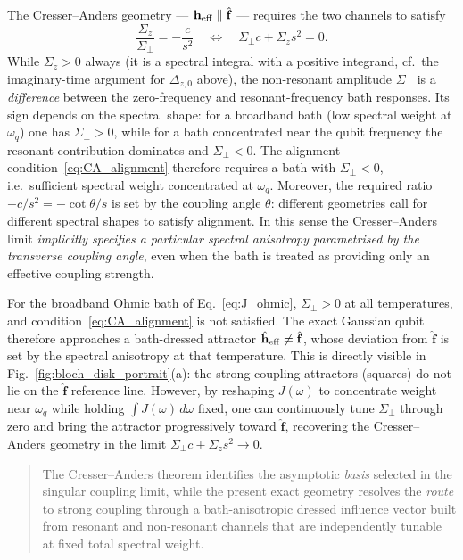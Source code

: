 The Cresser--Anders geometry --- $\mathbf h_{\rm eff}\parallel\hat{\mathbf f}$
--- requires the two channels to satisfy
\begin{equation}
  \frac{\Sigma_z}{\Sigma_\perp} = -\frac{c}{s^2}
  \quad \Leftrightarrow \quad \Sigma_\perp c + \Sigma_z s^2 = 0.
  \label{eq:CA_alignment}
\end{equation}
While $\Sigma_z > 0$ always (it is a spectral integral with a positive
integrand, cf.\ the imaginary-time argument for $\Delta_{z,0}$ above), the
non-resonant amplitude $\Sigma_\perp$ is a \emph{difference} between the
zero-frequency and resonant-frequency bath responses.  Its sign depends on the
spectral shape: for a broadband bath (low spectral weight at $\omega_q$) one
has $\Sigma_\perp > 0$, while for a bath concentrated near the qubit frequency
the resonant contribution dominates and $\Sigma_\perp < 0$.  The alignment
condition~\eqref{eq:CA_alignment} therefore requires a bath with $\Sigma_\perp
< 0$, i.e.\ sufficient spectral weight concentrated at $\omega_q$.  Moreover,
the required ratio $-c/s^2 = -\cot\theta/s$ is set by the coupling angle
$\theta$: different geometries call for different spectral shapes to satisfy
alignment.  In this sense the Cresser--Anders limit \emph{implicitly specifies
a particular spectral anisotropy parametrised by the transverse coupling
angle}, even when the bath is treated as providing only an effective coupling
strength.

For the broadband Ohmic bath of Eq.~\eqref{eq:J_ohmic}, $\Sigma_\perp > 0$ at
all temperatures, and condition~\eqref{eq:CA_alignment} is not satisfied.  The
exact Gaussian qubit therefore approaches a bath-dressed attractor $\hat{\mathbf
h}_{\rm eff} \neq \hat{\mathbf f}$, whose deviation from $\hat{\mathbf f}$
is set by the spectral anisotropy at that temperature.  This is directly
visible in Fig.~\ref{fig:bloch_disk_portrait}(a): the strong-coupling
attractors (squares) do not lie on the $\hat{\mathbf f}$ reference line.
However, by reshaping $J(\omega)$ to concentrate weight near $\omega_q$ while
holding $\int J(\omega)\,d\omega$ fixed, one can continuously tune
$\Sigma_\perp$ through zero and bring the attractor progressively toward
$\hat{\mathbf f}$, recovering the Cresser--Anders geometry in the limit
$\Sigma_\perp c + \Sigma_z s^2\to 0$.

\begin{quote}
The Cresser--Anders theorem identifies the asymptotic \emph{basis} selected in
the singular coupling limit, while the present exact geometry resolves the
\emph{route} to strong coupling through a bath-anisotropic dressed influence
vector built from resonant and non-resonant channels that are independently
tunable at fixed total spectral weight.
\end{quote}

